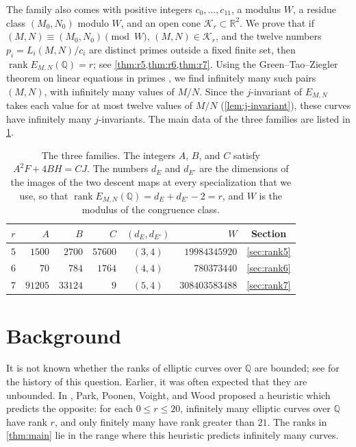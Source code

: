\documentclass[12pt,oneside,openany]{book}
\theoremstyle{definition}
\theoremstyle{plain}
\numberwithin{equation}{chapter}
\theoremstyle{plain}
\theoremstyle{definition}
\theoremstyle{remark}
\newcommand{\Q}{\mathbb Q}
\newcommand{\R}{\mathbb R}
\DeclareMathOperator{\rk}{rank}
\newcommand{\cK}{\mathcal K}
\begin{document}
The family also comes with positive integers $c_0,\dots,c_{11}$, a modulus $W$, a residue class $(M_0,N_0)$ modulo $W$, and an open cone $\cK_r\subset\R^2$. We prove that if $(M,N)\equiv(M_0,N_0)\pmod W$, $(M,N)\in\cK_r$, and the twelve numbers $p_i=L_i(M,N)/c_i$ are distinct primes outside a fixed finite set, then $\rk E_{M,N}(\Q)=r$; see \cref{thm:r5,thm:r6,thm:r7}. Using the Green--Tao--Ziegler theorem on linear equations in primes \cite{GT2010,GT2012,GTZ2012}, we find infinitely many such pairs $(M,N)$, with infinitely many values of $M/N$. Since the $j$-invariant of $E_{M,N}$ takes each value for at most twelve values of $M/N$ (\cref{lem:j-invariant}), these curves have infinitely many $j$-invariants. The main data of the three families are listed in \cref{tab:intro-families}.

\begin{table}[ht]
\centering
\begin{tabular}{@{}crrrcrc@{}}
\toprule
$r$ & $A$ & $B$ & $C$ & $(d_E,d_{E'})$ & $W$ & Section\\
\midrule
$5$ & $1500$ & $2700$ & $57600$ & $(3,4)$ & $19984345920$ & \ref{sec:rank5}\\
$6$ & $70$ & $784$ & $1764$ & $(4,4)$ & $780373440$ & \ref{sec:rank6}\\
$7$ & $91205$ & $33124$ & $9$ & $(5,4)$ & $308403583488$ & \ref{sec:rank7}\\
\bottomrule
\end{tabular}
\caption{The three families. The integers $A$, $B$, and $C$ satisfy $A^2F+4BH=CJ$. The numbers $d_E$ and $d_{E'}$ are the dimensions of the images of the two descent maps at every specialization that we use, so that $\rk E_{M,N}(\Q)=d_E+d_{E'}-2=r$, and $W$ is the modulus of the congruence class.}
\label{tab:intro-families}
\end{table}

\section{Background}\label{sec:intro-background}

It is not known whether the ranks of elliptic curves over $\Q$ are bounded; see \cite[\S3]{PPVW2019} for the history of this question. Earlier, it was often expected that they are unbounded. In \cite{PPVW2019}, Park, Poonen, Voight, and Wood proposed a heuristic which predicts the opposite: for each $0\le r\le 20$, infinitely many elliptic curves over $\Q$ have rank $r$, and only finitely many have rank greater than $21$. The ranks in \cref{thm:main} lie in the range where this heuristic predicts infinitely many curves.
\end{document}
